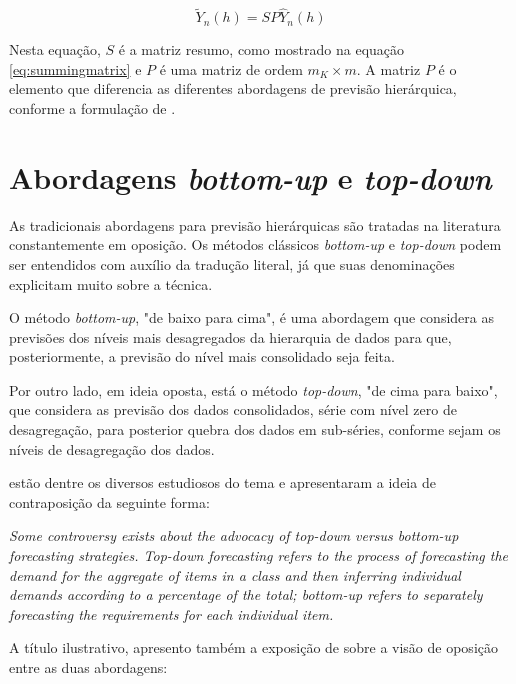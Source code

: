 \documentclass[
	12pt,				%
	openright,			%
	twoside,			%
	a4paper,			%
	english,			%
	french,				%
	spanish,			%
	brazil				%
	]{abntex2}
\begin{document}
\begin{equation}
\tilde{Y}_n(h) = SP\hat{Y}_n(h)
\end{equation}

Nesta equação, $S$ é a matriz resumo, como mostrado na equação \ref{eq:summingmatrix} e $P$ é uma matriz de ordem $m_K \times m$.
A matriz $P$ é o elemento que diferencia as diferentes abordagens de previsão hierárquica, conforme a formulação de .


\section{Abordagens \emph{bottom-up} e \emph{top-down}}


As tradicionais abordagens para previsão hierárquicas são tratadas na literatura constantemente em oposição. Os métodos clássicos \emph{bottom-up} e \emph{top-down} podem ser entendidos com auxílio da tradução literal, já que suas denominações explicitam muito sobre a técnica. 

O método \emph{bottom-up}, "de baixo para cima", é uma abordagem que considera as previsões dos níveis mais desagregados da hierarquia de dados para que, posteriormente, a previsão do nível mais consolidado seja feita.

Por outro lado, em ideia oposta, está o método \emph{top-down}, "de cima para baixo", que considera as previsão dos dados consolidados, série com nível zero de desagregação, para posterior quebra dos dados em sub-séries, conforme sejam os níveis de desagregação dos dados.

 estão dentre os diversos estudiosos do tema e apresentaram a ideia de contraposição da seguinte forma:

\begin{citacao}
\emph{Some controversy exists about the advocacy of top-down versus bottom-up forecasting strategies. Top-down forecasting refers to the process of forecasting the demand for the aggregate of items in a class and then inferring individual demands according to a percentage of the total; bottom-up refers to separately forecasting the requirements for each individual item.}
 \end{citacao}

A título ilustrativo, apresento também a exposição de  sobre a visão de oposição entre as duas abordagens:
\end{document}
